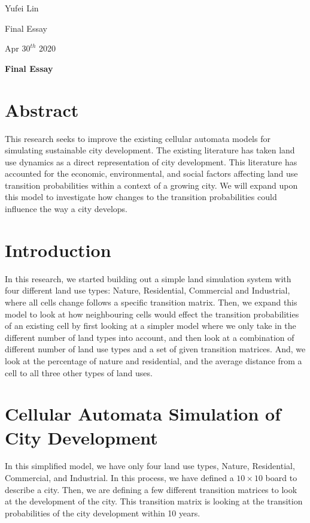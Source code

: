 \documentclass[a4paper,12pt]{report}
\begin{document}
\noindent
Yufei Lin

\noindent
Final Essay

\noindent
Apr \(30^{th}\) 2020

\begin{center}
\textbf{Final Essay}
\end{center}

\section*{Abstract}

This research seeks to improve the existing cellular automata models for simulating sustainable city development. The existing literature has taken land use dynamics as a direct representation of city development. This literature has accounted for the economic, environmental, and social factors affecting land use transition probabilities within a context of a growing city. We will expand upon this model to investigate how changes to the transition probabilities could influence the way a city develops. 

\section{Introduction}

In this research, we started building out a simple land simulation system with four different land use types: Nature, Residential, Commercial and Industrial, where all cells change follows a specific transition matrix. Then, we expand this model to look at how neighbouring cells would effect the transition probabilities of an existing cell by first looking at a simpler model where we only take in the different number of land types into account, and then look at a combination of different number of land use types and a set of given transition matrices. And, we look at the percentage of nature and residential, and the average distance from a cell to all three other types of land uses.  

\section{Cellular Automata Simulation of City Development}

In this simplified model, we have only four land use types, Nature, Residential, Commercial, and Industrial. In this process, we have defined a $10\times 10$ board to describe a city. Then, we are defining a few different transition matrices to look at the development of the city. This transition matrix is looking at the transition probabilities of the city development within 10 years. 
\end{document}

